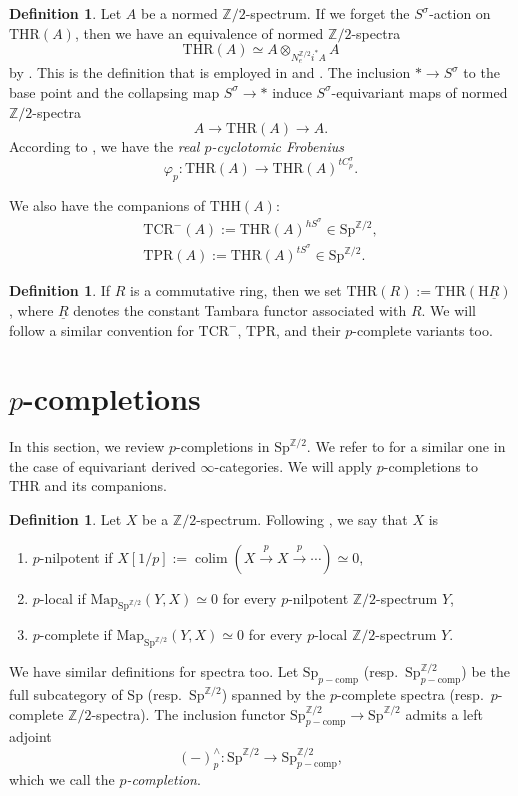 \documentclass[10pt]{amsart}
\theoremstyle{definition}
\newtheorem{df}[thm]{Definition}
\numberwithin{equation}{section}
\newcommand{\Z}{\mathbb{Z}}
\newcommand{\rH}{\mathrm{H}}
\newcommand{\ul}{\underline}
\newcommand{\Sp}{\mathrm{Sp}}
\newcommand{\Map}{\mathrm{Map}}
\newcommand{\comp}{\mathrm{comp}}
\newcommand{\colim}{\mathop{\mathrm{colim}}}
\newcommand{\THH}{\mathrm{THH}}
\newcommand{\TPR}{\mathrm{TPR}}
\newcommand{\THR}{\mathrm{THR}}
\newcommand{\TCR}{\mathrm{TCR}}
\begin{document}
{\begin{df}
Let $A$ be a normed $\Z/2$-spectrum.
If we forget the $S^\sigma$-action on $\THR(A)$,
then we have an equivalence of normed $\Z/2$-spectra
\[
\THR(A)
\simeq
A\otimes_{ N_e^{\Z/2}i^* A} A
\]
by \cite[Remark 5.3]{QS22}.
This is the definition that is employed in \cite{HP23} and \cite{HP}.
The inclusion $*\to S^\sigma$ to the base point and the collapsing map $S^\sigma\to *$ induce $S^\sigma$-equivariant maps of normed $\Z/2$-spectra
\[
A\to \THR(A)\to A.
\]
According to \cite[Construction 5.5]{QS22},
we have the \emph{real $p$-cyclotomic Frobenius}
\[
\varphi_p\colon \THR(A)\to \THR(A)^{t C_p^\sigma}.
\]

We also have the companions of $\THH(A)$:
\begin{gather*}
\TCR^-(A)
:=
\THR(A)^{hS^\sigma}\in \Sp^{\Z/2},
\\
\TPR(A)
:=
\THR(A)^{tS^\sigma}\in \Sp^{\Z/2}.
\end{gather*}
\end{df}

\begin{df}
If $R$ is a commutative ring,
then we set $\THR(R):=\THR(\rH \ul{R})$,
where $\ul{R}$ denotes the constant Tambara functor associated with $R$.
We will follow a similar convention for $\TCR^-$, $\TPR$, and their $p$-complete variants too.
\end{df}

\section{\texorpdfstring{$p$}{p}-completions}

In this section,
we review $p$-completions in $\Sp^{\Z/2}$.
We refer to \cite[\S 2]{HP} for a similar one in the case of equivariant derived $\infty$-categories.
We will apply $p$-completions to $\THR$ and its companions.


\begin{df}
\label{comp.1}
Let $X$ be a $\Z/2$-spectrum.
Following \cite[Definitions 7.1.1.1, 7.2.4.1, 7.3.1.1]{SAG},
we say that $X$ is
\begin{enumerate}
\item[(1)] $p$-nilpotent if
\(
X[1/p]
:=
\colim(X\xrightarrow{p} X\xrightarrow{p} \cdots)
\simeq 0,
\)
\item[(2)] $p$-local if $\Map_{\Sp^{\Z/2}}(Y,X)\simeq 0$ for every $p$-nilpotent $\Z/2$-spectrum $Y$,
\item[(3)] $p$-complete  if $\Map_{\Sp^{\Z/2}}(Y,X)\simeq 0$ for every $p$-local $\Z/2$-spectrum $Y$.
\end{enumerate}
We have similar definitions for spectra too.
Let $\Sp_{p-\comp}$ (resp.\ $\Sp_{p-\comp}^{\Z/2}$) be the full subcategory of $\Sp$ (resp.\ $\Sp^{\Z/2}$) spanned by the $p$-complete spectra (resp.\ $p$-complete $\Z/2$-spectra).
The inclusion functor $\Sp_{p-\comp}^{\Z/2}\to \Sp^{\Z/2}$ admits a left adjoint
\[
(-)_p^\wedge \colon \Sp^{\Z/2}\to \Sp_{p-\comp}^{\Z/2},
\]
which we call the \emph{$p$-completion}.
\end{df}



}
\end{document}

